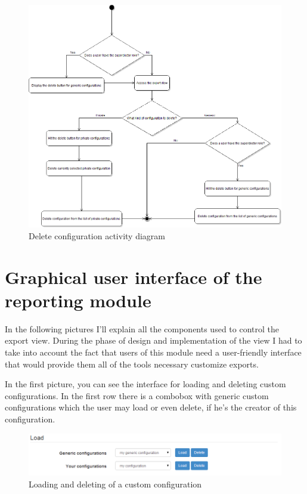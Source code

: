 \documentclass[thesis=B,english]{FITthesis}[2012/10/20]
\begin{document}
\begin{figure}
	\centering
 	\includegraphics[width=1\textwidth]{images/deleteConfigurationDiagram.png}
 	\caption{Delete configuration activity diagram}
 	\label{fig:deleteConfigurationDiagram}
\end{figure}


\section{Graphical user interface of the reporting module}
In the following pictures I'll explain all the components used to control the export view. During the phase of design and implementation of the view I had to take into account the fact that users of this module need a user-friendly interface that would provide them all of the tools necessary customize exports.

In the first picture, you can see the interface for loading and deleting custom configurations. In the first row there is a combobox with generic custom configurations which the user may load or even delete, if he's the creator of this configuration.

\begin{figure}
	\centering
 	\includegraphics[width=1\textwidth]{images/load.png}
 	\caption{Loading and deleting of a custom configuration}
 	\label{fig:load}
\end{figure}
\end{document}
